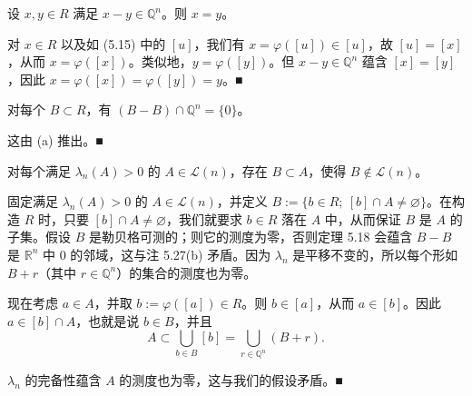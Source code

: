 \begin{remark}

\begin{items}
\item

设 $ x, y \in R $ 满足 $ x - y \in \mathbb{Q}^n $。则 $ x = y $。

\proofhead
对 $ x \in R $ 以及如 (5.15) 中的 $ [u] $，我们有 $ x = \varphi([u]) \in [u] $，故 $ [u] = [x] $，从而 $ x = \varphi([x]) $。类似地，$ y = \varphi([y]) $。但 $ x - y \in \mathbb{Q}^n $ 蕴含 $ [x] = [y] $，因此 $ x = \varphi([x]) = \varphi([y]) = y $。\nobreak\hspace{0.35em}■
\item

对每个 $ B \subset R $，有 $ (B - B) \cap \mathbb{Q}^n = \{0\} $。

\proofhead
这由 (a) 推出。\nobreak\hspace{0.35em}■
\end{items}

\end{remark}

\begin{theorem}

对每个满足 $ \lambda_n(A) > 0 $ 的 $ A \in \mathcal{L}(n) $，存在 $ B \subset A $，使得 $ B \notin \mathcal{L}(n) $。

\proofhead
固定满足 $ \lambda_n(A) > 0 $ 的 $ A \in \mathcal{L}(n) $，并定义 $ B := \{ b \in R ;\ [b] \cap A \ne \varnothing \} $。在构造 $ R $ 时，只要 $ [b] \cap A \ne \varnothing $，我们就要求 $ b \in R $ 落在 $ A $ 中，从而保证 $ B $ 是 $ A $ 的子集。假设 $ B $ 是勒贝格可测的；则它的测度为零，否则定理 5.18 会蕴含 $ B - B $ 是 $ \mathbb{R}^n $ 中 $ 0 $ 的邻域，这与注 5.27(b) 矛盾。因为 $ \lambda_n $ 是平移不变的，所以每个形如 $ B + r $（其中 $ r \in \mathbb{Q}^n $）的集合的测度也为零。

现在考虑 $ a \in A $，并取 $ b := \varphi([a]) \in R $。则 $ b \in [a] $，从而 $ a \in [b] $。因此 $ a \in [b] \cap A $，也就是说 $ b \in B $，并且
\[
A \subset \bigcup_{b \in B} [b] = \bigcup_{r \in \mathbb{Q}^n} (B + r) .
\]

$ \lambda_n $ 的完备性蕴含 $ A $ 的测度也为零，这与我们的假设矛盾。\nobreak\hspace{0.35em}■

\end{theorem}

